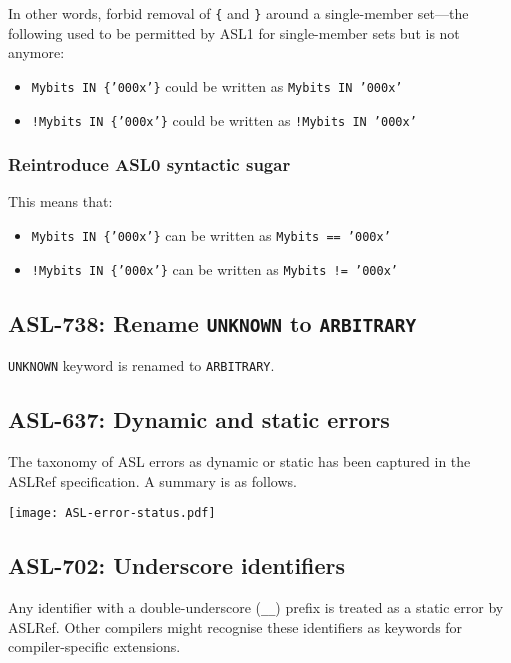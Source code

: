 In other words, forbid removal of \texttt{\{} and \texttt{\}} around a
single-member set---the following used to be permitted by ASL1 for
single-member sets but is not anymore:

\begin{itemize}
\item \texttt{Mybits IN \{'000x'\}} could be written as \texttt{Mybits IN '000x'}
\item \texttt{!Mybits IN \{'000x'\}} could be written as \texttt{!Mybits
IN '000x'}
\end{itemize}

\subsubsection{Reintroduce ASL0 syntactic sugar}

This means that:
\begin{itemize}
\item \texttt{Mybits IN \{'000x'\}} can be written as \texttt{Mybits == '000x'}
\item \texttt{!Mybits IN \{'000x'\}} can be written as \texttt{Mybits != '000x'}
\end{itemize}

\subsection{ASL-738: Rename \texttt{UNKNOWN} to \texttt{ARBITRARY}}

\texttt{UNKNOWN} keyword is renamed to \texttt{ARBITRARY}.


\subsection{ASL-637: Dynamic and static errors}

The taxonomy of ASL errors as dynamic or static has been captured in the ASLRef
specification. A summary is as follows.

\texttt{[image: ASL-error-status.pdf]}

\subsection{ASL-702: Underscore identifiers}

Any identifier with a double-underscore (\texttt{\_\_}) prefix is
treated as a static error by ASLRef. Other compilers might recognise
these identifiers as keywords for compiler-specific extensions.


